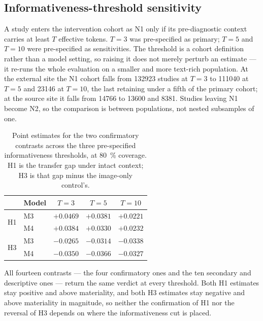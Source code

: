 \subsection{Informativeness-threshold sensitivity}
\label{sec:threshold-sensitivity}

A study enters the intervention cohort as N1 only if its pre-diagnostic context
carries at least $T$ effective tokens. $T = 3$ was pre-specified as primary;
$T = 5$ and $T = 10$ were pre-specified as sensitivities. The threshold is a
cohort definition rather than a model setting, so raising it does not merely
perturb an estimate --- it re-runs the whole evaluation on a smaller and more
text-rich population. At the external site the N1 cohort falls from
\num{132923} studies at $T = 3$ to \num{111040} at $T = 5$ and \num{23146} at
$T = 10$, the last retaining under a fifth of the primary cohort; at the source
site it falls from \num{14766} to \num{13600} and \num{8381}. Studies leaving N1
become N2, so the comparison is between populations, not nested subsamples of
one.

\begin{table}[htbp]
\centering
\caption{Point estimates for the two confirmatory contrasts across the three
pre-specified informativeness thresholds, at \SI{80}{\percent} coverage. H1 is
the transfer gap under intact context; H3 is that gap minus the image-only
control's.}
\label{tab:threshold-sensitivity}
\begin{tabular}{llccc}
\toprule
& Model & $T = 3$ & $T = 5$ & $T = 10$ \\
\midrule
\multirow{2}{*}{H1} & M3 & $+0.0469$ & $+0.0381$ & $+0.0221$ \\
                    & M4 & $+0.0384$ & $+0.0330$ & $+0.0232$ \\
\midrule
\multirow{2}{*}{H3} & M3 & $-0.0265$ & $-0.0314$ & $-0.0338$ \\
                    & M4 & $-0.0350$ & $-0.0366$ & $-0.0327$ \\
\bottomrule
\end{tabular}
\end{table}

All fourteen contrasts --- the four confirmatory ones and the ten secondary and
descriptive ones --- return the same verdict at every threshold. Both H1
estimates stay positive and above materiality, and both H3 estimates stay
negative and above materiality in magnitude, so neither the confirmation of H1
nor the reversal of H3 depends on where the informativeness cut is placed.

